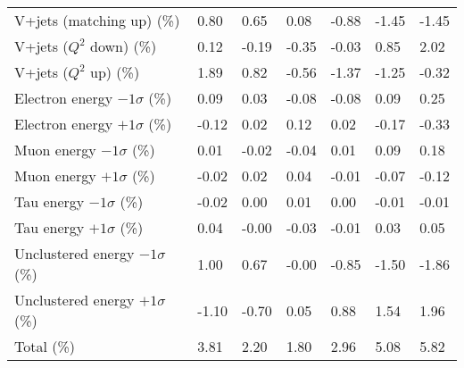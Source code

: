 \begin{table}[htp]
{\begin{tabular}{l|l|l|l|l|l|l}
	V+jets (matching up) (\%) & 0.80 & 0.65 & 0.08 & -0.88 & -1.45 & -1.45\\ 
	V+jets ($Q^{2}$ down) (\%) & 0.12 & -0.19 & -0.35 & -0.03 & 0.85 & 2.02\\ 
	V+jets ($Q^{2}$ up) (\%) & 1.89 & 0.82 & -0.56 & -1.37 & -1.25 & -0.32\\ 
	\midrule
	Electron energy $-1\sigma$ (\%) & 0.09 & 0.03 & -0.08 & -0.08 & 0.09 & 0.25\\ 
	Electron energy $+1\sigma$ (\%) & -0.12 & 0.02 & 0.12 & 0.02 & -0.17 & -0.33\\ 
	Muon energy $-1\sigma$ (\%) & 0.01 & -0.02 & -0.04 & 0.01 & 0.09 & 0.18\\ 
	Muon energy $+1\sigma$ (\%) & -0.02 & 0.02 & 0.04 & -0.01 & -0.07 & -0.12\\ 
	Tau energy $-1\sigma$ (\%) & -0.02 & 0.00 & 0.01 & 0.00 & -0.01 & -0.01\\ 
	Tau energy $+1\sigma$ (\%) & 0.04 & -0.00 & -0.03 & -0.01 & 0.03 & 0.05\\ 
	Unclustered energy $-1\sigma$ (\%) & 1.00 & 0.67 & -0.00 & -0.85 & -1.50 & -1.86\\ 
	Unclustered energy $+1\sigma$ (\%) & -1.10 & -0.70 & 0.05 & 0.88 & 1.54 & 1.96\\ 
	\midrule
	Total (\%) & 3.81  & 2.20  & 1.80  & 2.96  & 5.08  & 5.82 \\
	\bottomrule
	\end{tabular}
}
\end{table}